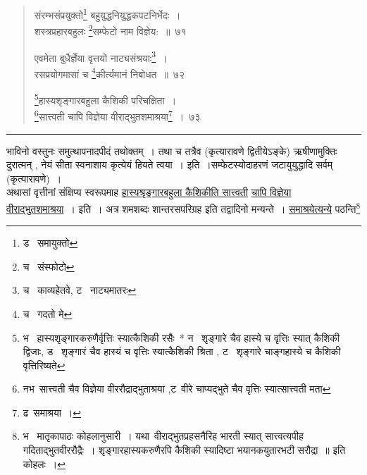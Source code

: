 \documentclass[11pt, openany]{book}
\begin{document}
\begin{quote}
{\na संरम्भसंप्रयुक्तो\renewcommand{\thefootnote}{1}\footnote{ड \textendash\ समायुक्तो} बहुयुद्धनियुद्धकपटनिर्भेदः~।\\
शस्त्रप्रहारबहुलः \renewcommand{\thefootnote}{2}\footnote{च \textendash\ संस्फोटो}सम्फेटो नाम विज्ञेय:~॥~७१

एवमेता बुधैर्ज्ञेया वृत्तयो नाट्यसंश्रयाः\renewcommand{\thefootnote}{3}\footnote{च \textendash\ काव्यहेतवे, ट \textendash\ नाट्यमातरः}~।\\
रसप्रयोगमासां च \renewcommand{\thefootnote}{4}\footnote{च \textendash\ गदतो मे}कीर्त्यमानं निबोधत~॥~७२

\renewcommand{\thefootnote}{5}\footnote{भ \textendash\ हास्यशृङ्गारकरुणैर्वृत्तिः स्यात्कैशिकी रसैः\textendash\ * न \textendash\ शृङ्गारे चैव हास्ये च वृत्तिः स्यात् कैशिकी द्विजाः, ड \textendash\ शृङ्गारं चैव हास्यं च वृत्तिः स्यात्कैशिकी श्रिता , ट \textendash\ शृङ्गारे चाङ्गहास्ये च कैशिकी वृत्तिरिष्यते}हास्यशृङ्गारबहुला कैशिकी परिचक्षिता~।\\
\renewcommand{\thefootnote}{6}\footnote{नभ\textendash\ सात्त्वती चैव विज्ञेया वीररौद्राद्भुताश्रया ,ट\textendash\ वीरे चाप्यद्भुते चैव वृत्तिः स्यात्सात्त्वती मता}सात्त्वती चापि विज्ञेया वीराद्भुतशमाश्रया\renewcommand{\thefootnote}{7}\footnote{ढ\textendash\ समाश्रया~।}~।~७३}
\end{quote}

\hrule

\vspace{2mm}
\noindent
भाविनो वस्तुनः समुत्थापनादपीदं तथोक्तम्~। तथा च तत्रैव (कृत्यारावणे द्वितीयेऽङ्के) ऋषीणामुक्तिः\textendash \\

दुरात्मन् , नेयं सीता स्वनाशाय कृत्येयं हियते त्वया~। इति~।सम्फेटस्योदाहरणं जटायुयुद्धादि सर्वम् (कृत्यारावणे)~।\\

अथासां वृत्तीनां संक्षिप्य स्वरूपमाह \underline{हास्यश्रृङ्गारबहुला कैशिकीति सात्त्वती} \underline{चापि विज्ञेया वीराद्भुतशमाश्रया}~। इति~। अत्र शमशब्दः शान्तरसपरिग्रह इति तद्वादिनो मन्यन्ते~। \underline{समाश्रयेत्यन्ये} पठन्ति\renewcommand{\thefootnote}{*}\footnote{भ \textendash\ मातृकापाठः कोहलानुसारी~। यथा\textendash\ वीराद्भुतप्रहसनैरिह भारती स्यात् सात्त्वत्यपीह गदिताद्भुतवीररौद्रैः~। शृङ्गारहास्यकरुणैरपि कैशिकी स्यादिष्टा भयानकयुतारभटी सरौद्रा~॥ इति कोहलः~।}


\newpage
\lfoot{}
\end{document}
